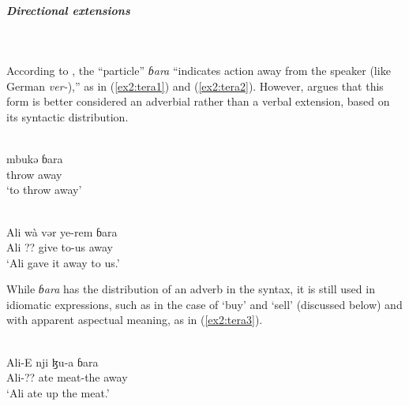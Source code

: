 \subparagraph{Directional extensions}~


According to \citet[18]{newmanGrammarTeraTransformational1970}, the ``particle'' \textit{ɓara} ``indicates action away from the speaker (like German \textit{ver-}),'' as in (\ref{ex2:tera1}) and (\ref{ex2:tera2}). However, \citet[314--315]{schuhChadicCornucopia2017} argues that this form is better considered an adverbial rather than a verbal extension, based on its syntactic distribution. 


\ea\label{ex2:tera1}
 \\
\gll mbukə ɓara	\\
throw away		\\
\glt `to throw away'

\ex\label{ex2:tera2}
 \\
\gll Ali wà vər ye-rem ɓara	\\
Ali ?? give to-us away		\\
\glt `Ali gave it away to us.'
\z 

While \textit{ɓara} has the distribution of an adverb in the syntax, it is still used in idiomatic expressions, such as in the case of `buy' and `sell' (discussed below) and with apparent aspectual meaning, as in (\ref{ex2:tera3}). 

\ea\label{ex2:tera3}
 \\
\gll Ali-E nji ɮu-a ɓara \\
Ali-?? ate meat-the away \\
\glt `Ali ate up the meat.'
\z 

